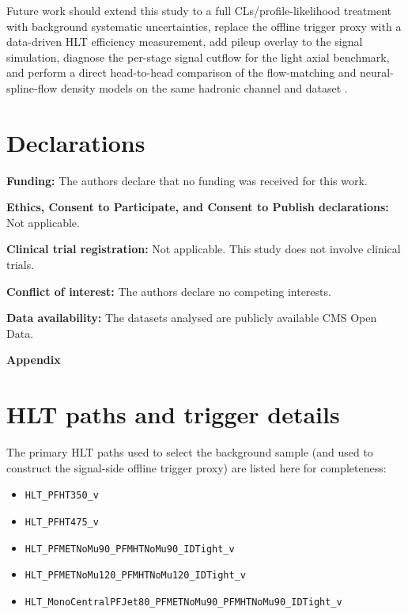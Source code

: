 \documentclass[11pt,a4paper,twocolumn]{article}
\begin{document}
Future work should extend this study to a full CLs/profile-likelihood
treatment with background systematic uncertainties, replace the offline
trigger proxy with a data-driven HLT efficiency measurement, add pileup
overlay to the signal simulation, diagnose the per-stage signal cutflow for
the light axial benchmark, and perform a direct head-to-head comparison of
the flow-matching and neural-spline-flow density models on the same hadronic
channel and dataset \cite{rasineni_nsf_monoz}.

\section*{Declarations}

\noindent\textbf{Funding:} The authors declare that no funding was received for this work.

\noindent\textbf{Ethics, Consent to Participate, and Consent to Publish declarations:} Not applicable.

\noindent\textbf{Clinical trial registration:} Not applicable. This study does not involve clinical trials.

\noindent\textbf{Conflict of interest:} The authors declare no competing interests.

\noindent\textbf{Data availability:} The datasets analysed are publicly available CMS Open Data.

\clearpage
\onecolumn
\raggedbottom
\appendix
\begin{center}
\Large\textbf{Appendix}
\end{center}
\vspace{1em}

\section{HLT paths and trigger details}
\label{app:hlt}

The primary HLT paths used to select the background sample (and used to
construct the signal-side offline trigger proxy) are listed here for
completeness:

\begin{itemize}
  \item \texttt{HLT\_PFHT350\_v}
  \item \texttt{HLT\_PFHT475\_v}
  \item \texttt{HLT\_PFMETNoMu90\_PFMHTNoMu90\_IDTight\_v}
  \item \texttt{HLT\_PFMETNoMu120\_PFMHTNoMu120\_IDTight\_v}
  \item \texttt{HLT\_MonoCentralPFJet80\_PFMETNoMu90\_PFMHTNoMu90\_IDTight\_v}
\end{itemize}
\end{document}
